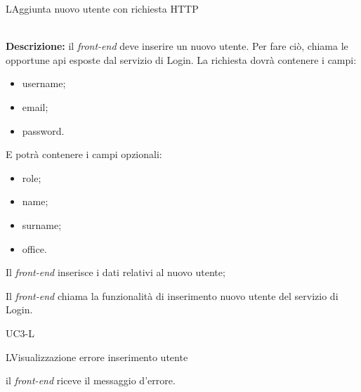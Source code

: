 \begin{usecase}{2}{L}{Aggiunta nuovo utente con richiesta HTTP}


	\textbf{\\Descrizione:} il \textit{front-end} deve inserire un nuovo utente. Per fare ciò,
	chiama le opportune \acrshort{api} esposte dal servizio di Login. La richiesta dovrà contenere i campi:
	\begin{itemize}[noitemsep]
		\item username;
		\item email;
		\item password.
	\end{itemize}
	E potrà contenere i campi opzionali:
	\begin{itemize}[noitemsep]
		\item role;
		\item name;
		\item surname;
		\item office.
	\end{itemize}

	\begin{ucscenarioprincipale}
		\item Il \textit{front-end} inserisce i dati relativi al nuovo utente;
		\item Il \textit{front-end} chiama la funzionalità di inserimento nuovo utente del servizio di Login.
	\end{ucscenarioprincipale}
	
	
	\begin{ucestensioni}
		\item UC3-L
	\end{ucestensioni}

	\label{uc:richiesta-aggiunta-utente-l}
\end{usecase}

\begin{usecase}{3}{L}{Visualizzazione errore inserimento utente}
	
	

	\begin{ucscenarioprincipale}
		\item il \textit{front-end} riceve il messaggio d'errore.
	\end{ucscenarioprincipale}

	
	\label{uc:vis-errore-ins-utente-l}
\end{usecase}

